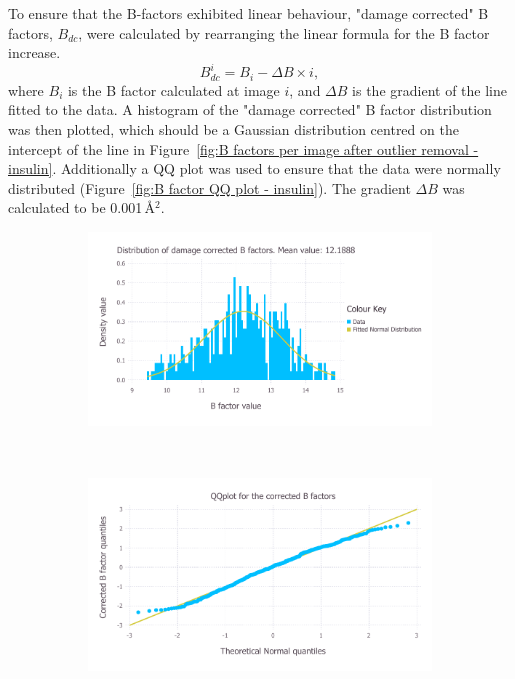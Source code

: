 To ensure that the B-factors exhibited linear behaviour, "damage corrected" B factors, $B_{dc}$, were calculated by rearranging the linear formula for the B factor increase.
\begin{equation}
    B^i_{dc} = B_i - \Delta B \times i,
\end{equation}
where $B_i$ is the B factor calculated at image $i$, and $\Delta B$ is the gradient of the line fitted to the data.
A histogram of the "damage corrected" B factor distribution was then plotted, which should be a Gaussian distribution centred on the intercept of the line in Figure~\ref{fig:B factors per image after outlier removal - insulin}.
Additionally a QQ plot was used to ensure that the data were normally distributed (Figure~\ref{fig:B factor QQ plot - insulin}).
The gradient $\Delta B$ was calculated to be 0.001$\,$\AA$^2$.
\begin{figure}
    \centering
    \begin{subfigure}[b]{1.0\textwidth}
            \centering
            \includegraphics[width=\textwidth]{figures/datared/BFac_Distribution.pdf}
            \caption{}
            \label{fig:Damage corrected B factor distribution - insulin}
    \end{subfigure}
    \\
    \begin{subfigure}[b]{1.0\textwidth}
            \centering
            \includegraphics[width=\textwidth]{figures/datared/BFac_QQplot.pdf}

\end{subfigure}
\end{figure}

